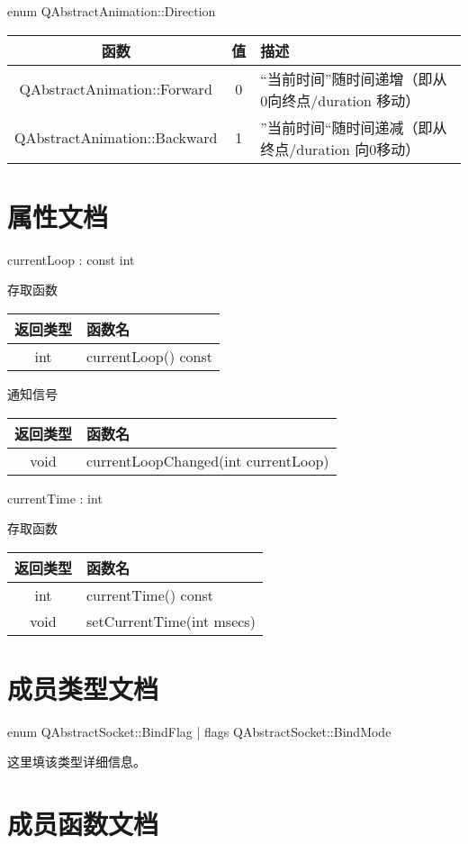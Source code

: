 enum QAbstractAnimation::Direction	

\begin{tabular}{|c|c|l|}
\hline
函数 	&值 &	描述 \\ 
\hline
QAbstractAnimation::Forward &	0 &	“当前时间”随时间递增（即从0向终点/duration 移动）\\
\hline
QAbstractAnimation::Backward &	1 &	”当前时间“随时间递减（即从终点/duration 向0移动）\\
\hline
\end{tabular}

\section{属性文档}	

currentLoop : const int


存取函数

\begin{tabular}{|c|l|}
\hline
返回类型 	&函数名 \\ 
\hline
int &	currentLoop() const \\ 
\hline
\end{tabular}


通知信号

\begin{tabular}{|c|l|}
\hline
返回类型 	&函数名 \\ 
\hline
void &	currentLoopChanged(int currentLoop) \\
\hline
\end{tabular}


currentTime : int

存取函数

\begin{tabular}{|c|l|}
\hline
返回类型 	&函数名 \\ 
\hline
int &	currentTime() const \\ 
\hline
void 	&setCurrentTime(int msecs) \\
\hline
\end{tabular}

\section{成员类型文档}

enum QAbstractSocket::BindFlag | flags QAbstractSocket::BindMode

这里填该类型详细信息。

\section{成员函数文档}

